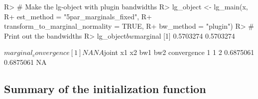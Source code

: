 \begin{example}
R> # Make the lg-object with plugin bandwidths
R> lg_object <- lg_main(x,
R+                      est_method = "5par_marginals_fixed",
R+                      transform_to_marginal_normality = TRUE,
R+                      bw_method = "plugin")
R> # Print out the bandwidths
R> lg_object$bw

$marginal
[1] 0.5703274 0.5703274

$marginal_convergence
[1] NA NA

$joint
  x1 x2       bw1       bw2 convergence
1  1  2 0.6875061 0.6875061          NA
\end{example}

\subsection{Summary of the initialization function}
\label{summary-of-the-initialization-function}

